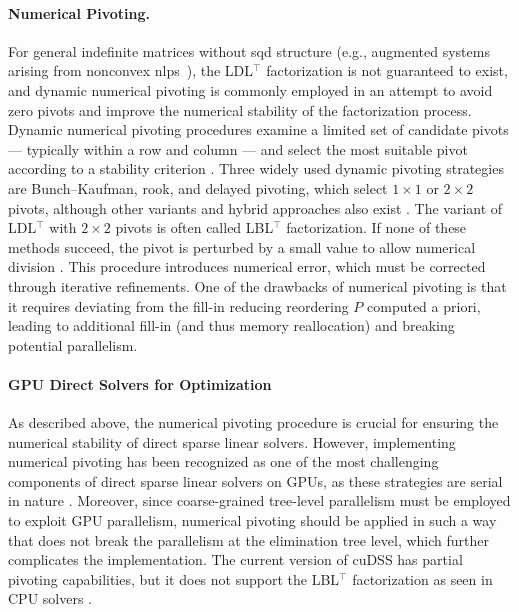 \documentclass{article}
\begin{document}
\paragraph{Numerical Pivoting.}

For general indefinite matrices without \gls*{sqd} structure (e.g., augmented systems  arising from nonconvex \glspl*{nlp}~\cite{wachterImplementationInteriorpointFilter2006}), the LDL$^\top$ factorization is not guaranteed to exist, and dynamic numerical pivoting is commonly employed in an attempt to avoid zero pivots and improve the numerical stability of the factorization process.
Dynamic numerical pivoting procedures examine a limited set of candidate pivots --- typically within a row and column --- and select the most suitable pivot according to a stability criterion \cite{schenkFASTFACTORIZATIONPIVOTING}.
Three widely used dynamic pivoting strategies are Bunch–Kaufman, rook, and delayed pivoting, which select $1 \times 1$ or $2 \times 2$ pivots, although other variants and hybrid approaches also exist \cite{duff2017}.
The variant of LDL$^\top$ with $2 \times 2$ pivots is often called LBL$^\top$ factorization.
If none of these methods succeed, the pivot is perturbed by a small value to allow numerical division \cite{schenkFASTFACTORIZATIONPIVOTING}.
This procedure introduces numerical error, which must be corrected through iterative refinements.
One of the drawbacks of numerical pivoting is that it requires deviating from the fill-in reducing reordering $P$ computed a priori, leading to additional fill-in (and thus memory reallocation) and breaking potential parallelism.


\paragraph{GPU Direct Solvers for Optimization}
As described above, the numerical pivoting procedure is crucial for ensuring the numerical stability of direct sparse linear solvers.
However, implementing numerical pivoting has been recognized as one of the most challenging components of direct sparse linear solvers on GPUs, as these strategies are serial in nature \cite{swirydowiczLinearSolversPower2022}.
Moreover, since coarse-grained tree-level parallelism must be employed to exploit GPU parallelism, numerical pivoting should be applied in such a way that does not break the parallelism at the elimination tree level, which further complicates the implementation.
The current version of cuDSS has partial pivoting capabilities, but it does not support the LBL$^\top$ factorization as seen in CPU solvers \cite{nvidiaNVIDIACuDSSPreview}.
\end{document}
